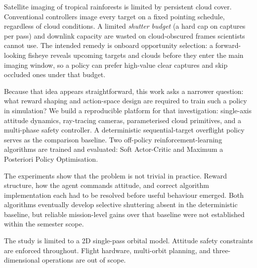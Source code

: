 Satellite imaging of tropical rainforests is limited by persistent cloud cover.
Conventional controllers image every target on a fixed pointing schedule, regardless of cloud conditions.
A limited \emph{shutter budget} (a hard cap on captures per pass) and downlink capacity are wasted on cloud-obscured frames scientists cannot use.
The intended remedy is onboard opportunity selection: a forward-looking fisheye reveals upcoming targets and clouds before they enter the main imaging window, so a policy can prefer high-value clear captures and skip occluded ones under that budget.

Because that idea appears straightforward, this work asks a narrower question:
what reward shaping and action-space design are required to train such a policy in simulation?
We build a reproducible platform for that investigation: single-axis attitude dynamics, ray-tracing cameras, parameterised cloud primitives, and a multi-phase safety controller.
A deterministic sequential-target overflight policy serves as the comparison baseline.
Two off-policy reinforcement-learning algorithms are trained and evaluated: Soft Actor-Critic and Maximum a Posteriori Policy Optimisation.

The experiments show that the problem is not trivial in practice.
Reward structure, how the agent commands attitude, and correct algorithm implementation each had to be resolved before useful behaviour emerged.
Both algorithms eventually develop selective shuttering absent in the deterministic baseline, but reliable mission-level gains over that baseline were not established within the semester scope.

The study is limited to a 2D single-pass orbital model.
Attitude safety constraints are enforced throughout.
Flight hardware, multi-orbit planning, and three-dimensional operations are out of scope.

